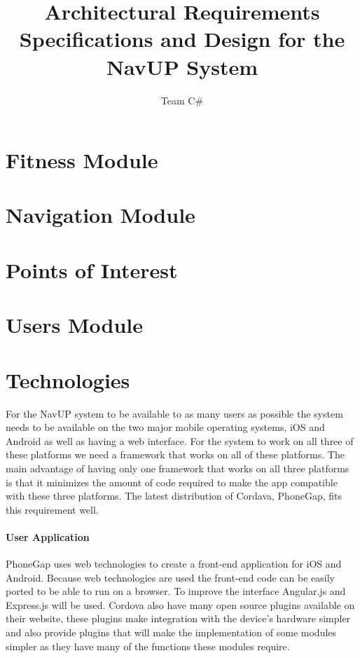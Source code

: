 \documentclass[11pt]{article}
\author{Team C\#}
\title{Architectural Requirements Specifications and Design for the NavUP System}
\begin{document}
	\setlength{\parskip}{6pt}
	
	
	
	\tableofcontents
	
	\newpage

\section{Fitness Module}
    
    
\section{Navigation Module}
    

\section{Points of Interest}
    
    
\section{Users Module}
    
    
\section{Technologies}
For the NavUP system to be available to as many users as possible the system needs to be available on the two major mobile operating systems, iOS and Android as well as having a web interface. For the system to work on all three of these platforms we need a framework that works on all of these platforms. The main advantage of having only one framework that works on all three platforms is that it minimizes the amount of code required to make the app compatible with these three platforms. The latest distribution of Cordava, PhoneGap, fits this requirement well.

\paragraph{User Application}
PhoneGap uses web technologies to create a front-end application for iOS and Android. Because web technologies are used the front-end code can be easily ported to be able to run on a browser. To improve the interface Angular.js and Express.js will be used. Cordova also have many open source plugins available on their website, these plugins make integration with the device's hardware simpler and also provide plugins that will make the implementation of some modules simpler as they have many of the functions these modules require.
\end{document}
